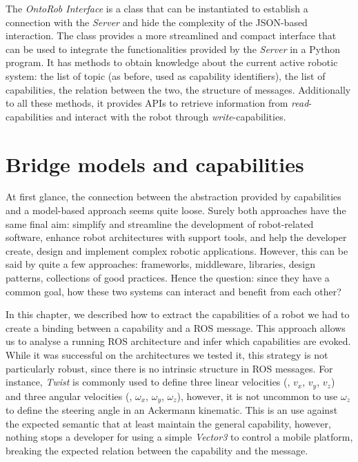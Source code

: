 The \textit{OntoRob Interface} is a class that can be instantiated to establish a connection with the \textit{Server} and hide the complexity of the JSON-based interaction. The class provides a more streamlined and compact interface that can be used to integrate the functionalities provided by the \textit{Server} in a Python program. It has methods to obtain knowledge about the current active robotic system: the list of topic (as before, used as capability identifiers), the list of capabilities, the relation between the two, the structure of messages. Additionally to all these methods, it provides APIs to retrieve information from \textit{read}-capabilities and interact with the robot through \textit{write}-capabilities.

\section{Bridge models and capabilities}
At first glance, the connection between the abstraction provided by capabilities and a model-based approach seems quite loose. Surely both approaches have the same final aim: simplify and streamline the development of robot-related software, enhance robot architectures with support tools, and help the developer create, design and implement complex robotic applications. However, this can be said by quite a few approaches: frameworks, middleware, libraries, design patterns, collections of good practices. Hence the question: since they have a common goal, how these two systems can interact and benefit from each other?

In this chapter, we described how to extract the capabilities of a robot we had to create a binding between a capability and a ROS message. This approach allows us to analyse a running ROS architecture and infer which capabilities are evoked. While it was successful on the architectures we tested it, this strategy is not particularly robust, since there is no intrinsic structure in ROS messages. For instance, \textit{Twist} is commonly used to define three linear velocities (\ie, $v_x$, $v_y$, $v_z$) and three angular velocities (\ie, $\omega_x$, $\omega_y$, $\omega_z$), however, it is not uncommon to use $\omega_z$ to define the steering angle in an Ackermann kinematic. This is an use against the expected semantic that at least maintain the general capability, however, nothing stops a developer for using a simple \textit{Vector3} to control a mobile platform, breaking the expected relation between the capability and the message.

